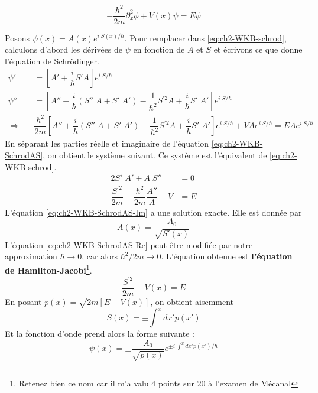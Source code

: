 \documentclass{book}
\begin{document}
\begin{equation}\label{eq:ch2-WKB-schrod}
  -\dfrac{\hbar^2}{2m} \partial_x ^2 \phi + V(x)\psi = E\psi
\end{equation}

Posons $\psi(x) = A(x) e^{i\; S(x)/\hbar}$. Pour remplacer dans \ref{eq:ch2-WKB-schrod}, calculons d'abord les dérivées de $\psi$ en fonction de $A$ et $S$ et écrivons ce que donne l'équation de Schrödinger.
\begin{align}
  \psi' &= \left[ A' + \dfrac{i}{\hbar} S' A\right]e^{i\; S/\hbar} \\
  \psi'' &= \left[A'' + \dfrac{i}{\hbar} (S''\; A + S'\; A') - \dfrac{1}{\hbar ^2} S^{\prime 2} A + \dfrac{i}{\hbar} S' \; A'\right] e ^{i\; S/\hbar} \\
  \Rightarrow -&\dfrac{\hbar ^2 }{2m} \left[A'' + \dfrac{i}{\hbar} (S''\; A + S'\; A') - \dfrac{1}{\hbar ^2} S^{\prime 2} A + \dfrac{i}{\hbar} S' \; A'\right] e ^{i\; S/\hbar} + VA e ^{i\; S/\hbar} = EA e ^{i\; S/\hbar} \label{eq:ch2-WKB-SchrodAS}
\end{align}
En séparant les parties réelle et imaginaire de l'équation \ref{eq:ch2-WKB-SchrodAS}, on obtient le système suivant. Ce système est l'équivalent de \ref{eq:ch2-WKB-schrod}.
\begin{align}
      2S' \; A' + A \; S'' &= 0 \label{eq:ch2-WKB-SchrodAS-Im} \\
      \dfrac{S^{\prime 2}}{2m} - \dfrac{\hbar ^2}{2m} \dfrac{A''}{A} + V &= E \label{eq:ch2-WKB-SchrodAS-Re} 
\end{align}
L'équation \ref{eq:ch2-WKB-SchrodAS-Im} a une solution exacte. Elle est donnée par 
\begin{equation}
  A(x) = \dfrac{A_0}{\sqrt{S'(x)}}
\end{equation}
L'équation \ref{eq:ch2-WKB-SchrodAS-Re} peut être modifiée par notre approximation $\hbar \longrightarrow 0$, car alors $\hbar ^2/2m \longrightarrow 0$. L'équation obtenue est \textbf{l'équation de Hamilton-Jacobi}\footnote{Retenez bien ce nom car il m'a valu 4 points sur 20 à l'examen de Mécanal}.
\begin{equation}
  \dfrac{S^{\prime 2}}{2m} + V(x) = E
\end{equation}
En posant $p(x) = \sqrt{2m[E - V(x)]}$, on obtient aisemment
\begin{equation}
  S(x) = \pm \int ^x d x' p(x')
\end{equation}
Et la fonction d'onde prend alors la forme suivante :
\begin{equation} \label{eq:ch2-WKB-solution}
  \psi(x) = \pm \dfrac{A_0}{\sqrt{p(x)}} e^{\pm i \; \int ^x d x' p(x')/\hbar}
\end{equation}
\end{document}
